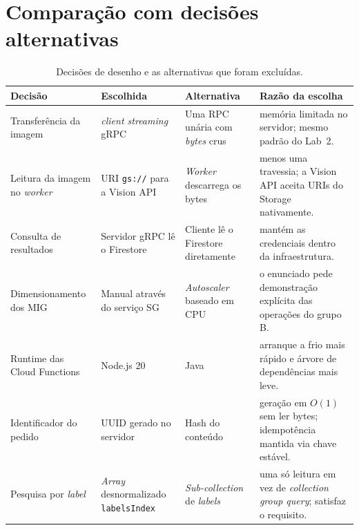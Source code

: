 \documentclass[11pt,a4paper]{article}
\begin{document}
\section{Compara\c{c}\~ao com decis\~oes alternativas}
\label{sec:alternativas}

\begin{table}[h]
\centering
\small
\begin{tabular}{@{}p{34mm}p{34mm}p{34mm}p{52mm}@{}}
\toprule
Decis\~ao & Escolhida & Alternativa & Raz\~ao da escolha \\
\midrule
Transfer\^encia da imagem & \emph{client streaming} gRPC & Uma RPC un\'aria com \emph{bytes} crus &
mem\'oria limitada no servidor; mesmo padr\~ao do Lab~2. \\

Leitura da imagem no \emph{worker} & URI \texttt{gs://} para a Vision API & \emph{Worker} descarrega os bytes &
menos uma travessia; a Vision API aceita URIs do Storage nativamente. \\

Consulta de resultados & Servidor gRPC l\^e o Firestore & Cliente l\^e o Firestore diretamente &
mant\'em as credenciais dentro da infraestrutura. \\

Dimensionamento dos MIG & Manual atrav\'es do servi\c{c}o SG & \emph{Autoscaler} baseado em CPU &
o enunciado pede demonstra\c{c}\~ao expl\'icita das opera\c{c}\~oes do grupo B. \\

Runtime das Cloud Functions & Node.js 20 & Java &
arranque a frio mais r\'apido e \'arvore de depend\^encias mais leve. \\

Identificador do pedido & UUID gerado no servidor & Hash do conte\'udo &
gera\c{c}\~ao em $O(1)$ sem ler bytes; idempot\^encia mantida via chave est\'avel. \\

Pesquisa por \emph{label} & \emph{Array} desnormalizado \texttt{labelsIndex} & \emph{Sub-collection} de \emph{labels} &
uma s\'o leitura em vez de \emph{collection group query}; satisfaz o requisito. \\
\bottomrule
\end{tabular}
\caption{Decis\~oes de desenho e as alternativas que foram exclu\'idas.}
\end{table}

\end{document}
